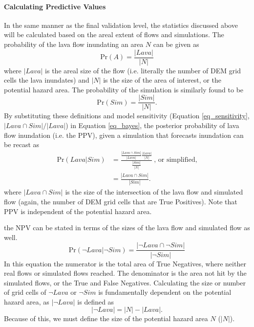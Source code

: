 		\paragraph{Calculating Predictive Values} In the same manner as the final validation level, the statistics discussed above will be calculated based on the areal extent of flows and simulations. The probability of the lava flow inundating an area $N$ can be given as
		\begin{equation}
			\text{Pr}(A)=\frac{|Lava|}{|N|}\label{eq_PA}
		\end{equation}
		where $|Lava|$ is the areal size of the flow (i.e. literally the number of DEM grid cells the lava inundates) and $|N|$ is the size of the area of interest, or the potential hazard area. The probability of the simulation is similarly found to be
		\begin{equation}
			\text{Pr}(Sim)=\frac{|Sim|}{|N|}.\label{eq_PB}
		\end{equation}
		By substituting these definitions and model sensitivity (Equation \ref{eq_sensitivity}, $|Lava \cap Sim|/|Lava|$) in Equation \ref{eq_bayes}, the posterior probability of lava flow inundation (i.e. the PPV), given a simulation that forecasts inundation can be recast as
		\begin{align}
		\text{Pr}(Lava|Sim)&=\frac{\frac{|Lava\cap Sim|}{|Lava|}\frac{|Lava|}{|N|}}{\frac{|Sim|}{|N|}}~\text{,~or~simplified,}\label{eq_unsimplepost}\\
		&=\frac{|Lava\cap Sim|}{|Sim|}.\label{eq_simplepost}
		\end{align}
		where $|Lava\cap Sim|$ is the size of the intersection of the lava flow and simulated flow (again, the number of DEM grid cells that are True Positives). Note that PPV is independent of the potential hazard area.
		
		the NPV can be stated in terms of the sizes of the lava flow and simulated flow as well.
		\begin{equation}
			\text{Pr}(\neg Lava|\neg Sim)=\frac{|\neg Lava\cap \neg Sim|}{|\neg Sim|}\label{eq_simplenegpost}
		\end{equation}
		In this equation the numerator is the total area of True Negatives, where neither real flows or simulated flows reached. The denominator is the area not hit by the simulated flows, or the True and False Negatives. Calculating the size or number of grid cells of $\neg Lava$ or $\neg Sim$ is fundamentally dependent on the potential hazard area, as $|\neg Lava|$ is defined as
		\begin{equation}
			|\neg Lava| = |N| - |Lava|.
		\end{equation}
		Because of this, we must define the size of the potential hazard area $N$ ($|N|$).	
	

